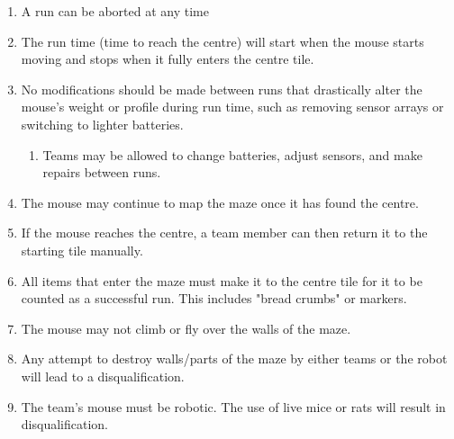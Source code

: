 \documentclass[a4paper,12pt]{article}
\begin{document}
\begin{enumerate}
    \item A run can be aborted at any time
    \item The run time (time to reach the centre) will start when the mouse starts moving and stops when it fully enters the centre tile.
    \item No modifications should be made between runs that drastically alter the mouse's weight or profile during run time, such as removing sensor arrays or switching to lighter batteries.
    \begin{enumerate}
        \item Teams may be allowed to change batteries, adjust sensors, and make repairs between runs.
    \end{enumerate}
    \item The mouse may continue to map the maze once it has found the centre.
    \item If the mouse reaches the centre, a team member can then return it to the starting tile manually.
    \item All items that enter the maze must make it to the centre tile for it to be counted as a successful run. This includes "bread crumbs" or markers.
    \item The mouse may not climb or fly over the walls of the maze.
    \item Any attempt to destroy walls/parts of the maze by either teams or the robot will lead to a disqualification.
    \item The team's mouse must be robotic. The use of live mice or rats will result in disqualification.
\end{enumerate}




\end{document}
